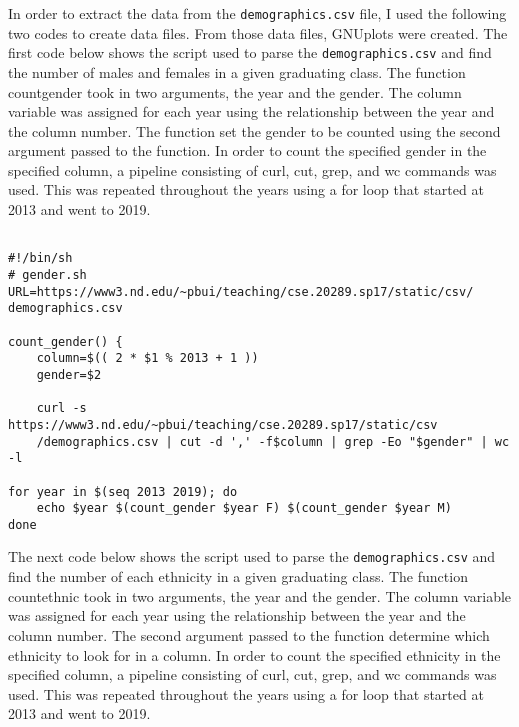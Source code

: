 \documentclass[letterpaper]{article}
\begin{document}
In order to extract the data from the {\tt demographics.csv} file, I used the following two codes to create data files. From those data files, GNUplots were created. The first code below shows the script used to parse the {\tt demographics.csv} and find the number of males and females in a given graduating class. The function countgender took in two arguments, the year and the gender. The column variable was assigned for each year using the relationship between the year and the column number. The function set the gender to be counted using the second argument passed to the function. In order to count the specified gender in the specified column, a pipeline consisting of curl, cut, grep, and wc commands was used. This was repeated throughout the years using a for loop that started at 2013 and went to 2019.

\vspace{5mm}

\begin{lstlisting}[frame=single]

#!/bin/sh                                                                       
# gender.sh                                                                     
URL=https://www3.nd.edu/~pbui/teaching/cse.20289.sp17/static/csv/
demographics.csv

count_gender() {
    column=$(( 2 * $1 % 2013 + 1 ))                                                                  
    gender=$2                    

    curl -s https://www3.nd.edu/~pbui/teaching/cse.20289.sp17/static/csv
    /demographics.csv | cut -d ',' -f$column | grep -Eo "$gender" | wc -l

for year in $(seq 2013 2019); do
    echo $year $(count_gender $year F) $(count_gender $year M)
done

\end{lstlisting}


The next code below shows the script used to parse the {\tt demographics.csv} and find the number of each ethnicity in a given graduating class. The function countethnic took in two arguments, the year and the gender. The column variable was assigned for each year using the relationship between the year and the column number. The second argument passed to the function determine which ethnicity to look for in a column. In order to count the specified ethnicity in the specified column, a pipeline consisting of curl, cut, grep, and wc commands was used. This was repeated throughout the years using a for loop that started at 2013 and went to 2019.
\end{document}
